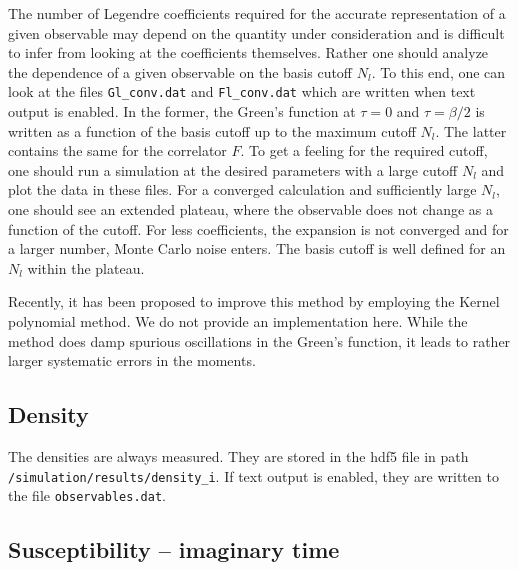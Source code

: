 \documentclass[aps,prb,floatfix,superscriptaddress,twocolumn,notitlepage]{revtex4-1}
\begin{document}
The number of Legendre coefficients required for the accurate representation of a given observable may depend on the quantity under consideration and is difficult to infer from looking at the coefficients themselves. Rather one should analyze the dependence of a given observable on the basis cutoff $N_{l}$. To this end, one can look at the files \verb#Gl_conv.dat# and \verb#Fl_conv.dat# which are written when text output is enabled. In the former, the Green's function at $\tau=0$ and $\tau=\beta/2$ is written as a function of the basis cutoff up to the maximum cutoff $N_{l}$. The latter contains the same for the correlator $F$. To get a feeling for the required cutoff, one should run a simulation at the desired parameters with a large cutoff $N_{l}$ and plot the data in these files.
For a converged calculation and sufficiently large $N_{l}$, one should see an extended plateau, where the observable does not change as a function of the cutoff. For less coefficients, the expansion is not converged and for a larger number, Monte Carlo noise enters. The basis cutoff is well defined for an $N_{l}$ within the plateau.

Recently, it has been proposed to improve this method by employing the Kernel polynomial method\cite{Huang12}. We do not provide an implementation here. While the method does damp spurious oscillations in the Green's function, it leads to rather larger systematic errors in the moments.

\subsection{Density}

The densities are always measured. They are stored in the hdf5 file in path \verb#/simulation/results/density_i#. If text output is enabled, they are written to the file \verb#observables.dat#.

\subsection{Susceptibility -- imaginary time}
\end{document}
